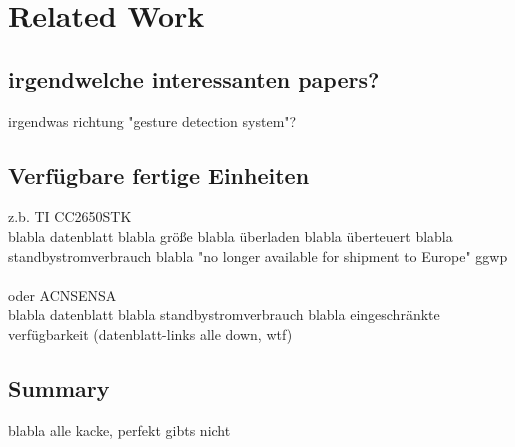 \chapter{Related Work}
\label{ch:relatedwork}

\section{irgendwelche interessanten papers?}
irgendwas richtung "gesture detection system"?

\section{Verfügbare fertige Einheiten}
z.b. TI CC2650STK\\
blabla datenblatt blabla größe blabla überladen blabla überteuert blabla standbystromverbrauch blabla "no longer available for shipment to Europe" ggwp\\
\\
oder ACNSENSA\\
blabla datenblatt blabla standbystromverbrauch blabla eingeschränkte verfügbarkeit (datenblatt-links alle down, wtf)

\section{Summary}
blabla alle kacke,  perfekt gibts nicht